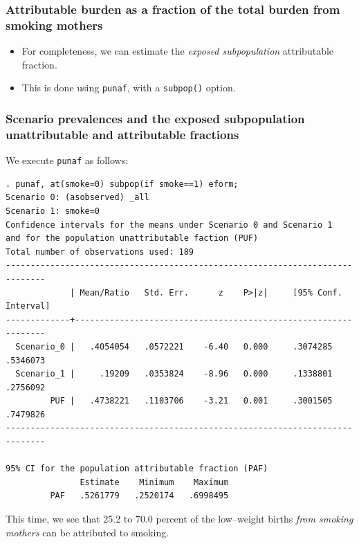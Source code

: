 \documentclass[11pt]{beamer}
\begin{document}
\begin{frame}
\frametitle{Attributable burden as a fraction of the total burden from smoking mothers}

\begin{itemize}

\item<2-> For completeness, we can estimate the \textit{exposed subpopulation} attributable fraction.

\item<3-> This is done using \texttt{punaf},
with a \texttt{subpop()} option.

\end{itemize}

\end{frame}

\begin{frame}[fragile]
\frametitle{Scenario prevalences and the exposed subpopulation unattributable and attributable fractions}

We execute \texttt{punaf} as follows:

\tiny
\begin{verbatim}
. punaf, at(smoke=0) subpop(if smoke==1) eform;
Scenario 0: (asobserved) _all
Scenario 1: smoke=0
Confidence intervals for the means under Scenario 0 and Scenario 1
and for the population unattributable faction (PUF)
Total number of observations used: 189
------------------------------------------------------------------------------
             | Mean/Ratio   Std. Err.      z    P>|z|     [95% Conf. Interval]
-------------+----------------------------------------------------------------
  Scenario_0 |   .4054054   .0572221    -6.40   0.000     .3074285    .5346073
  Scenario_1 |     .19209   .0353824    -8.96   0.000     .1338801    .2756092
         PUF |   .4738221   .1103706    -3.21   0.001     .3001505    .7479826
------------------------------------------------------------------------------

95% CI for the population attributable fraction (PAF)
               Estimate    Minimum    Maximum 
         PAF   .5261779   .2520174   .6998495 
\end{verbatim}
\normalsize

This time, we see that 25.2 to 70.0 percent of the low--weight births \textit{from smoking mothers}
can be attributed to smoking.

\end{frame}
\end{document}
